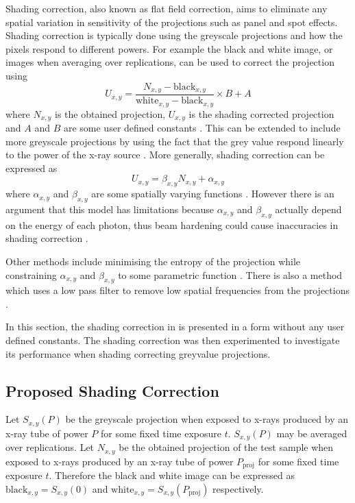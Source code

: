 Shading correction, also known as flat field correction, aims to eliminate any spatial variation in sensitivity of the projections such as panel and spot effects. Shading correction is typically done using the greyscale projections and how the pixels respond to different powers. For example the black and white image, or images when averaging over replications, can be used to correct the projection using
\begin{equation}
U_{x,y} = \dfrac{N_{x,y}-\text{black}_{x,y}}{\text{white}_{x,y}-\text{black}_{x,y}}\times B+A
\label{eq:data_shadingCorrectionOld}
\end{equation}
where $N_{x,y}$ is the obtained projection, $U_{x,y}$ is the shading corrected projection and $A$ and $B$ are some user defined constants \citep{young2000shading, munzenmayer2003enhancing}. This can be extended to include more greyscale projections by using the fact that the grey value respond linearly to the power of the x-ray source \citep{seibert1998flat}. More generally, shading correction can be expressed as
\begin{equation}
U_{x,y} = \beta_{x,y} N_{x,y} + \alpha_{x,y}
\end{equation}
where $\alpha_{x,y}$ and $\beta_{x,y}$ are some spatially varying functions \citep{munzenmayer2003enhancing}. However there is an argument that this model has limitations because $\alpha_{x,y}$ and $\beta_{x,y}$ actually depend on the energy of each photon, thus beam hardening could cause inaccuracies in shading correction \citep{davidson2003limitations}.

Other methods include minimising the entropy of the projection while constraining $\alpha_{x,y}$ and $\beta_{x,y}$ to some parametric function \citep{likar2000retrospective}. There is also a method which uses a low pass filter to remove low spatial frequencies from the projections \citep{young2000shading, munzenmayer2003enhancing}.

In this section, the shading correction in \cite{seibert1998flat} is presented in a form without any user defined constants. The shading correction was then experimented to investigate its performance when shading correcting greyvalue projections.

\subsection{Proposed Shading Correction}

Let $S_{x,y}(P)$ be the greyscale projection when exposed to x-rays produced by an x-ray tube of power $P$ for some fixed time exposure $t$. $S_{x,y}(P)$ may be averaged over replications. Let $N_{x,y}$ be the obtained projection of the test sample when exposed to x-rays produced by an x-ray tube of power $P_\text{proj}$ for some fixed time exposure $t$. Therefore the black and white image can be expressed as $\text{black}_{x,y}=S_{x,y}(0)$ and $\text{white}_{x,y}=S_{x,y}(P_\text{proj})$ respectively.

